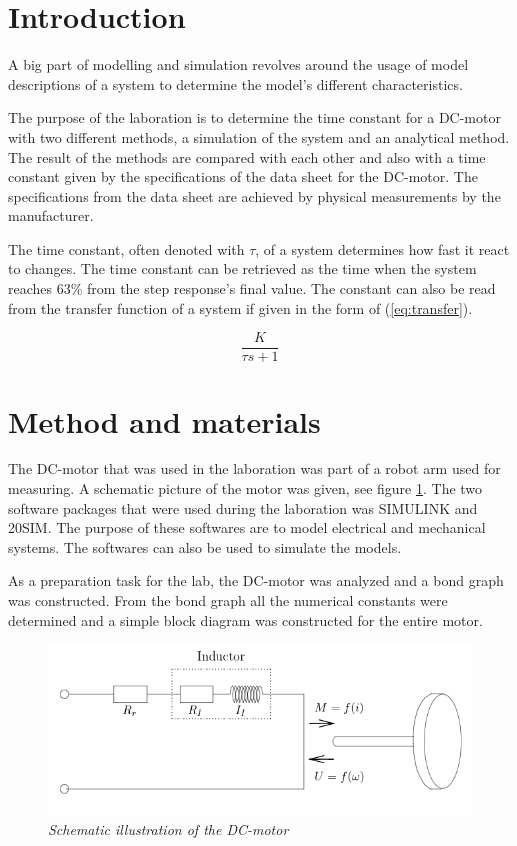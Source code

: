 \documentclass[12pt,a4paper]{article}
\begin{document}
\newpage

\tableofcontents

\newpage

\section{Introduction}
A big part of modelling and simulation revolves around the usage of model descriptions of a system to determine the model's different characteristics.

The purpose of the laboration is to determine the time constant for a DC-motor with two different methods, a simulation of the system and an analytical method. The result of the methods are compared with each other and also with a time constant given by the specifications of the data sheet for the DC-motor. The specifications from the data sheet are achieved by physical measurements by the manufacturer.

The time constant, often denoted with $\tau$, of a system determines how fast it react to changes. The time constant can be retrieved as the time when the system reaches 63\% from the step response's final value. The constant can also be read from the transfer function of a system if given in the form of (\ref{eq:transfer}).

\begin{equation}
\label{eq:transfer}
\frac{K}{\tau s+1}
\end{equation}

\section{Method and materials}
The DC-motor that was used in the laboration was part of a robot arm used for measuring. A schematic picture of the motor was given, see figure \ref{fig:dcmoto}.
The two software packages that were used during the laboration was SIMULINK and 20SIM. The purpose of these softwares are to model electrical and mechanical systems. The softwares can also be used to simulate the models.

As a preparation task for the lab, the DC-motor was analyzed and a bond graph was constructed. From the bond graph all the numerical constants were determined and a simple block diagram was constructed for the entire motor.
\begin{figure}
  \centering
  \includegraphics[width=1\linewidth]{schematicdcmotor.png}
  \caption{\emph{Schematic illustration of the DC-motor}}
  \label{fig:dcmoto}
\end{figure}
\end{document}

